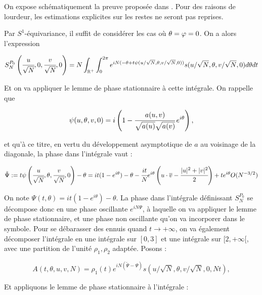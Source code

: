 \begin{preuve}
	On expose schématiquement la preuve proposée dans \cite{Shiffman2002}. Pour des raisons de lourdeur, les estimations explicites sur les restes ne seront pas reprises.
	
	\chantier
	
	Par $S^1$-équivariance, il suffit de considérer les cas où $\theta = \varphi = 0$. On a alors l'expression 
	
	\begin{equation*}
	S_N^{P_0}\left(\cfrac{u}{\sqrt{N}},0,\cfrac{v}{\sqrt{N}},0\right) = N \int_{\mathbb{R}^+}\int_0^{2\pi}e^{iN(-\theta + t\psi(u/\sqrt{N},\theta,v/\sqrt{N},0))}s(u/\sqrt{N},\theta, v/\sqrt{N},0)d\theta dt
	\end{equation*}
	
	Et on va appliquer le lemme de phase stationnaire à cette intégrale. On rappelle que 
	
	\begin{equation*}
	\psi(u,\theta,v,0) = i\left(1-\cfrac{a(u,v)}{\sqrt{a(u)}\sqrt{a(v)}}\,e^{i\theta}\right),
	\end{equation*}
	
	et qu'à ce titre, en vertu du développement asymptotique de $a$ au voisinage de la diagonale, la phase dans l'intégrale vaut :
	
	\begin{equation*}
	\tilde{\Psi} := t\psi\left(\cfrac{u}{\sqrt{N}},\theta,\cfrac{v}{\sqrt{N}},0\right) -\theta= it(1-e^{i\theta}) - \theta - \cfrac{it}{N}e^{i\theta}\left(u\cdot\overline{v} - \cfrac {|u|^2+|v|^2}{2}\right) + t e^{i\theta}O(N^{-3/2})
	\end{equation*}
	
	On note $\Psi(t,\theta) = it(1-e^{i\theta})-\theta$. La phase dans l'intégrale définissant $S_N^{P_0}$ se décompose donc en une phase oscillante $e^{iN\Psi}$, à laquelle on va appliquer le lemme de phase stationnaire, et une phase non oscillante qu'on va incorporer dans le symbole. Pour se débarasser des ennuis quand $t \to +\infty$, on va également décomposer l'intégrale en une intégrale sur $[0,3]$ et une intégrale sur $[2,+\infty[$, avec une partition de l'unité $\rho_1,\rho_2$ adaptée. Posons :
	
	\begin{equation*}
		A(t,\theta, u,v,N) = \rho_1(t)e^{iN(\tilde{\Psi}-\Psi)}s(u/\sqrt{N}, \theta, v/\sqrt{N},0, Nt),
	\end{equation*} 
	
	Et appliquons le lemme de phase stationnaire à l'intégrale :
	

\end{preuve}
